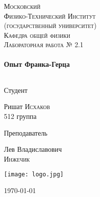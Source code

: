 \begin{titlepage}
\center %
 

\textsc{\LARGE Московский\\[-0.2cm]Физико-Технический Институт\\[0.1cm]\large (государственный университет)}\\[1.5cm] %
\textsc{\Large Кафедра общей физики}\\[0.1cm] %
\textsc{\large Лабораторная работа № 2.1}\\[0.5cm] %


\HRule
\\[0.3cm]
{\huge \bfseries Опыт Франка-Герца}
\\[0.3cm] %
\HRule
\\[1.5cm]


 

\begin{minipage}[t]{0.48\textwidth}
	\begin{flushleft} \large
		\textsf{Студент}
		
		Ришат \textsc{Исхаков} \\[-0.15cm]
		512 группа

	\end{flushleft}
\end{minipage}
\hfill
\begin{minipage}[t]{0.48\textwidth}
	\begin{flushright} \large
		\textsf{Преподаватель}		
		
		Лев Владиславович \\[-0.15cm]
		\textsc{Инжечик} 

	\end{flushright}
\end{minipage}

\begin{bottompar}
	\begin{center}
		\texttt{[image: logo.jpg]}
	\end{center}
	\today

\end{bottompar}
\vfill %

\end{titlepage}